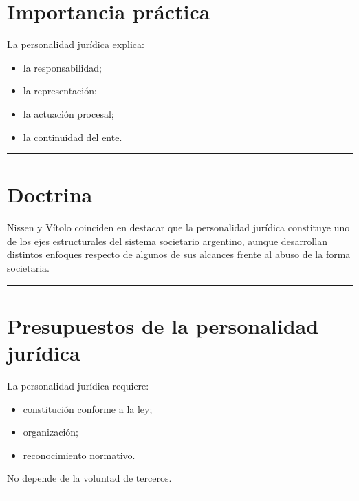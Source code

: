 \documentclass[
  spanish,
  letterpaper,
  DIV=11,
  numbers=noendperiod]{scrartcl}
\providecommand{\tightlist}{%
  \setlength{\itemsep}{0pt}\setlength{\parskip}{0pt}}
\begin{document}
\section{Importancia práctica}\label{importancia-pruxe1ctica}

La personalidad jurídica explica:

\begin{itemize}
\tightlist
\item
  la responsabilidad;
\item
  la representación;
\item
  la actuación procesal;
\item
  la continuidad del ente.
\end{itemize}

\begin{center}\rule{0.5\linewidth}{0.5pt}\end{center}

\section{Doctrina}\label{doctrina}

Nissen y Vítolo coinciden en destacar que la personalidad jurídica
constituye uno de los ejes estructurales del sistema societario
argentino, aunque desarrollan distintos enfoques respecto de algunos de
sus alcances frente al abuso de la forma societaria.

\begin{center}\rule{0.5\linewidth}{0.5pt}\end{center}

\section{Presupuestos de la personalidad
jurídica}\label{presupuestos-de-la-personalidad-juruxeddica}

La personalidad jurídica requiere:

\begin{itemize}
\tightlist
\item
  constitución conforme a la ley;
\item
  organización;
\item
  reconocimiento normativo.
\end{itemize}

No depende de la voluntad de terceros.

\begin{center}\rule{0.5\linewidth}{0.5pt}\end{center}
\end{document}
